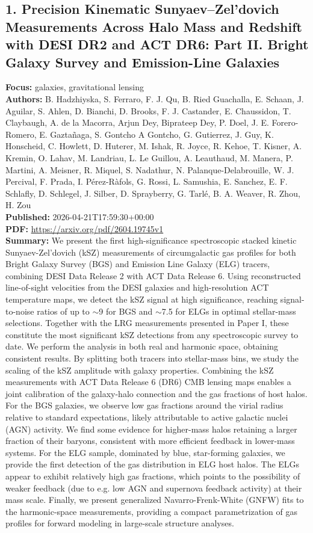 \documentclass[11pt]{article}
\begin{document}
\subsection*{1. Precision Kinematic Sunyaev--Zel'dovich Measurements Across Halo Mass and Redshift with DESI DR2 and ACT DR6: Part II. Bright Galaxy Survey and Emission-Line Galaxies}
\textbf{Focus:} galaxies, gravitational lensing\\
\textbf{Authors:} B. Hadzhiyska, S. Ferraro, F. J. Qu, B. Ried Guachalla, E. Schaan, J. Aguilar, S. Ahlen, D. Bianchi, D. Brooks, F. J. Castander, E. Chaussidon, T. Claybaugh, A. de la Macorra, Arjun Dey, Biprateep Dey, P. Doel, J. E. Forero-Romero, E. Gaztañaga, S. Gontcho A Gontcho, G. Gutierrez, J. Guy, K. Honscheid, C. Howlett, D. Huterer, M. Ishak, R. Joyce, R. Kehoe, T. Kisner, A. Kremin, O. Lahav, M. Landriau, L. Le Guillou, A. Leauthaud, M. Manera, P. Martini, A. Meisner, R. Miquel, S. Nadathur, N. Palanque-Delabrouille, W. J. Percival, F. Prada, I. Pérez-Ràfols, G. Rossi, L. Samushia, E. Sanchez, E. F. Schlafly, D. Schlegel, J. Silber, D. Sprayberry, G. Tarlé, B. A. Weaver, R. Zhou, H. Zou\\
\textbf{Published:} 2026-04-21T17:59:30+00:00\\
\textbf{PDF:} \href{https://arxiv.org/pdf/2604.19745v1}{https://arxiv.org/pdf/2604.19745v1}\\
\textbf{Summary:}
We present the first high-significance spectroscopic stacked kinetic Sunyaev-Zel'dovich (kSZ) measurements of circumgalactic gas profiles for both Bright Galaxy Survey (BGS) and Emission Line Galaxy (ELG) tracers, combining DESI Data Release 2 with ACT Data Release 6. Using reconstructed line-of-sight velocities from the DESI galaxies and high-resolution ACT temperature maps, we detect the kSZ signal at high significance, reaching signal-to-noise ratios of up to $\sim$9 for BGS and $\sim$7.5 for ELGs in optimal stellar-mass selections. Together with the LRG measurements presented in Paper I, these constitute the most significant kSZ detections from any spectroscopic survey to date. We perform the analysis in both real and harmonic space, obtaining consistent results. By splitting both tracers into stellar-mass bins, we study the scaling of the kSZ amplitude with galaxy properties. Combining the kSZ measurements with ACT Data Release 6 (DR6) CMB lensing maps enables a joint calibration of the galaxy-halo connection and the gas fractions of host halos. For the BGS galaxies, we observe low gas fractions around the virial radius relative to standard expectations, likely attributable to active galactic nuclei (AGN) activity. We find some evidence for higher-mass halos retaining a larger fraction of their baryons, consistent with more efficient feedback in lower-mass systems. For the ELG sample, dominated by blue, star-forming galaxies, we provide the first detection of the gas distribution in ELG host halos. The ELGs appear to exhibit relatively high gas fractions, which points to the possibility of weaker feedback (due to e.g. low AGN and supernova feedback activity) at their mass scale. Finally, we present generalized Navarro-Frenk-White (GNFW) fits to the harmonic-space measurements, providing a compact parametrization of gas profiles for forward modeling in large-scale structure analyses.
\end{document}
